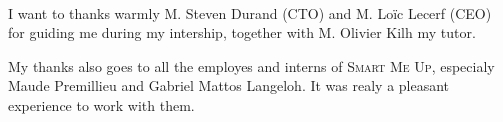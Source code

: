\documentclass[a4paper,11pt]{custom}
\newcommand{\smu}{\textsc{Smart Me Up}}
\begin{document}
~

\vspace{\fill}
\begin{flushright}
\begin{minipage}[b]{7cm}
I want to thanks warmly M. Steven Durand (CTO) and M. Loïc Lecerf (CEO) for
guiding me during my intership, together with M. Olivier Kilh my tutor.

\vspace{0.5em}

My thanks also goes to all the employes and interns of \smu, especialy Maude
Premillieu and Gabriel Mattos Langeloh. It was realy a pleasant experience to
work with them.
\end{minipage}
\end{flushright}
\vspace{\fill}
\vspace{\fill}
%
%
%
%
%
%
%
%
%



\end{document}
